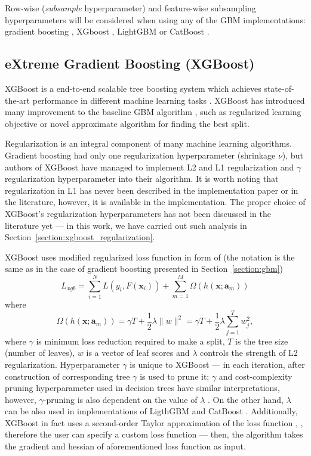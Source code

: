 \documentclass[magisterska, english]{pwr_wmat_praca_dyplomowa}
\theoremstyle{plain}
\numberwithin{theorem}{chapter}
\theoremstyle{definition}
\numberwithin{theorem}{chapter}
\begin{document}
Row-wise (\emph{subsample} hyperparameter) and feature-wise subsampling hyperparameters will be considered when using any of the GBM implementations: gradient boosting \cite{friedman_gbm}, XGboost \cite{xgboost}, LightGBM \cite{lightgbm} or CatBoost \cite{catboost}.  

\subsection{eXtreme Gradient Boosting (XGBoost)}
XGBoost is a end-to-end scalable tree boosting system which achieves state-of-the-art performance in different machine learning tasks \cite{xgboost}. XGBoost has introduced many improvement to the baseline GBM algorithm \cite{friedman_gbm}, such as regularized learning objective or novel approximate algorithm for finding the best split.

Regularization is an integral component of many machine learning algorithms. Gradient boosting \cite{friedman_gbm} had only one regularization hyperparameter (shrinkage $\nu$), but authors of XGBoost have managed to implement L2 and L1 regularization and $\gamma$ regularization hyperparameter into their algorithm. It is worth noting that regularization in L1 has never been described in the implementation paper \cite{xgboost} or in the literature, however, it is available in the implementation. The proper choice of XGBoost's regularization hyperparameters has not been discussed in the literature yet --- in this work, we have carried out such analysis in Section~\ref{section:xgboost_regularization}.

XGBoost uses modified regularized loss function in form of (the notation is the same as in the case of gradient boosting presented in Section~\ref{section:gbm}) \cite{comparative_analysis}
\begin{equation}\label{eq:xgboost_loss}
    L_{xgb} = \sum_{i=1}^N L\left(y_i, F(\mathbf{x}_i)\right) + \sum_{m=1}^M \Omega\left(h(\mathbf{x};\mathbf{a}_m)\right)
\end{equation}
where
\begin{equation}
    \Omega\left(h(\mathbf{x};\mathbf{a}_m)\right) = \gamma T + \frac12\lambda \lVert w\rVert^2 = \gamma T +\frac12\lambda\sum_{j=1}^T w_j^2,
\end{equation}
where $\gamma$ is minimum loss reduction required to make a split, $T$ is the tree size (number of leaves), $w$ is a vector of leaf scores and $\lambda$ controls the strength of L2 regularization. Hyperparameter $\gamma$ is unique to XGBoost --- in each iteration, after construction of corresponding tree $\gamma$ is used to prune it; $\gamma$ and cost-complexity pruning hyperparameter used in decision trees have similar interpretations, however, $\gamma$-pruning is also dependent on the value of $\lambda$ \cite{xgboost}. On the other hand, $\lambda$ can be also used in implementations of LigthGBM \cite{lightgbm} and CatBoost \cite{catboost}. Additionally, XGBoost in fact uses a second-order Taylor approximation of the loss function \cite{xgboost}, \cite{add_log}, therefore the user can specify a custom loss function --- then, the algorithm takes the gradient and hessian of aforementioned loss function as input.
\end{document}

